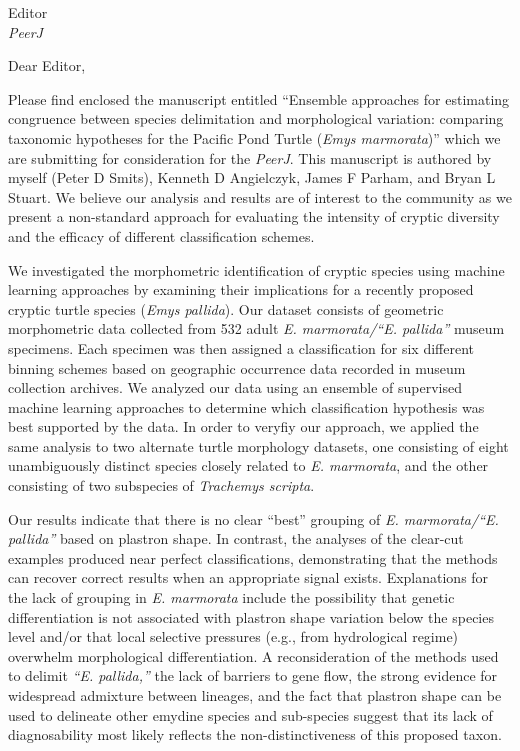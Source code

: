 \documentclass{letter}
\begin{document}
\begin{letter}{Editor \\ \textit{PeerJ}}
  \opening{Dear Editor,}

  Please find enclosed the manuscript entitled ``Ensemble approaches for estimating congruence between species delimitation and morphological variation: comparing taxonomic hypotheses for the Pacific Pond Turtle (\textit{Emys marmorata})'' which we are submitting for consideration for the \textit{PeerJ}. This manuscript is authored by myself (Peter D Smits), Kenneth D Angielczyk, James F Parham, and Bryan L Stuart. We believe our analysis and results are of interest to the community as we present a non-standard approach for evaluating the intensity of cryptic diversity and the efficacy of different classification schemes.

  We investigated the morphometric identification of cryptic species using machine learning approaches by examining their implications for a recently proposed cryptic turtle species (\textit{Emys pallida}). Our dataset consists of geometric morphometric data collected from  532 adult \textit{E. marmorata/``E. pallida''} museum specimens. Each specimen was then assigned a classification for six different binning schemes based on geographic occurrence data recorded in museum collection archives. We analyzed our data using an ensemble of supervised machine learning approaches to determine which classification hypothesis was best supported by the data. In order to veryfiy our approach, we applied the same analysis to two alternate turtle morphology datasets, one consisting of eight unambiguously distinct species closely related to \textit{E. marmorata}, and the other consisting of two subspecies of \textit{Trachemys scripta}. 
  
  Our results indicate that there is no clear ``best'' grouping of \textit{E. marmorata/``E. pallida''} based on plastron shape. In contrast, the analyses of the clear-cut examples produced near perfect classifications, demonstrating that the methods can recover correct results when an appropriate signal exists. Explanations for the lack of grouping in \textit{E. marmorata} include the possibility that genetic differentiation is not associated with plastron shape variation below the species level and/or that local selective pressures (e.g., from hydrological regime) overwhelm morphological differentiation. A reconsideration of the methods used to delimit \textit{``E. pallida,''} the lack of barriers to gene flow, the strong evidence for widespread admixture between lineages, and the fact that plastron shape can be used to delineate other emydine species and sub-species suggest that its lack of diagnosability most likely reflects the non-distinctiveness of this proposed taxon. 


\end{letter}
\end{document}
